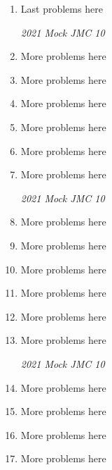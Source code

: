 \documentclass{article}
\newcommand{\mockAcronym}{JMC}
\newcommand{\tentwelve}{10} %
\newcommand{\theYear}{2021} %
\newcommand{\Label}{\emph{{\theYear} Mock {\mockAcronym} {\tentwelve}}\vspace{0.4cm}} %
\begin{document}
\begin{enumerate}
\item Last problems here


\newpage

\Label

\setcounter{enumi}{7} %

\item More problems here


\item More problems here


\item More problems here


\item More problems here


\item More problems here


\item More problems here


\newpage

\Label

\item More problems here


\item More problems here


\item More problems here


\item More problems here


\item More problems here


\item More problems here


\newpage

\Label

\item More problems here


\item More problems here


\item More problems here


\item More problems here


\end{enumerate}
\end{document}

